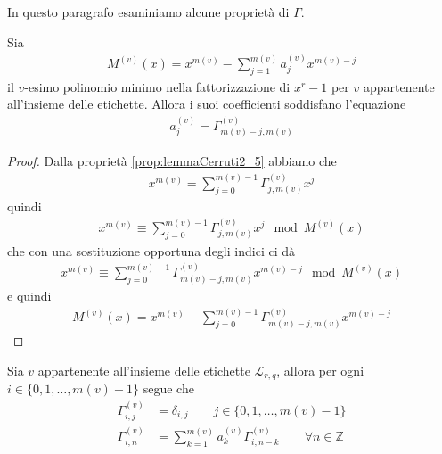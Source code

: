 In questo paragrafo esaminiamo alcune proprietà di $\Gamma$.
\begin{lemmax}
  Sia
  \begin{align*}
      M^{(v)}(x) = x^{m(v)} - \sum_{j=1}^{m(v)} a_{j}^{(v)} x^{m(v) - j}
  \end{align*}
  il $v$-esimo polinomio minimo nella fattorizzazione di $x^r - 1$ per $v$ appartenente all'insieme delle etichette. Allora i suoi coefficienti soddisfano l'equazione
  \begin{align*}
     a_{j}^{(v)} = \Gamma_{m(v) - j, m(v)}^{(v)}
  \end{align*}
\end{lemmax}
\begin{proof}
   Dalla proprietà \ref{prop:lemmaCerruti2_5} abbiamo che
   \begin{align*}
      x^{m(v)}  = \sum_{j = 0}^{ m(v) - 1} \Gamma_{j,m(v)}^{(v)}x^{j}
   \end{align*}
   quindi
   \begin{align*}
      x^{m(v)}  \equiv \sum_{j = 0}^{ m(v) - 1} \Gamma_{j,m(v)}^{(v)}x^{j} \mod{M^{(v)}(x)}
   \end{align*}
   che con una sostituzione opportuna degli indici ci dà
   \begin{align*}
      x^{m(v)}  \equiv \sum_{j = 0}^{ m(v) - 1} \Gamma_{m(v) - j,m(v)}^{(v)}x^{m(v) - j} \mod{M^{(v)}(x)}
   \end{align*}
   e quindi
   \begin{align*}
      M^{(v)}(x) = x^{m(v)} - \sum_{j = 0}^{ m(v) - 1} \Gamma_{m(v) - j,m(v)}^{(v)}x^{m(v) - j}
   \end{align*}

\end{proof}
\begin{teorema} \label{teo:winogradRicorrenza}
   Sia $v$ appartenente all'insieme delle etichette $\mathscr{L}_{r,q}$, allora per ogni $i \in \lbrace  0,1, \dots, m(v) - 1 \rbrace$ segue che
   \begin{align} \label{eq:winogradRicorrenza}
      \Gamma_{i,j}^{(v)} &= \delta_{i,j}  \qquad j \in \lbrace  0,1, \dots, m(v) - 1 \rbrace \\
      \Gamma_{i,n}^{(v)} &= \sum_{k=1}^{m(v)} a_{k}^{(v)} \Gamma_{i,n-k}^{(v)} \qquad \forall n \in \mathbb{Z}
   \end{align}
\end{teorema}
